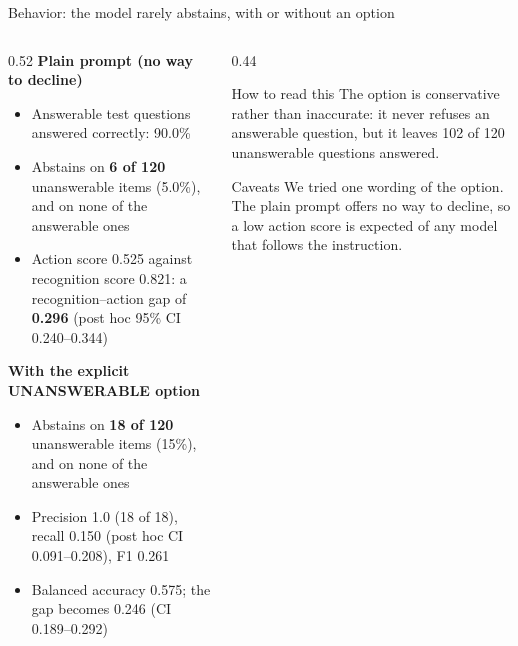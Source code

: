 \documentclass[aspectratio=169,11pt,usepdftitle=false]{beamer}
\begin{document}
\begin{frame}{Behavior: the model rarely abstains, with or without an option}
\scriptsize
\begin{columns}[T]
\begin{column}{0.52\textwidth}
\textbf{Plain prompt (no way to decline)}
\begin{itemize}
\item Answerable test questions answered correctly: 90.0\%
\item Abstains on \textbf{6 of 120} unanswerable items (5.0\%), and on none of the answerable ones
\item Action score 0.525 against recognition score 0.821: a recognition--action gap of \textbf{0.296} (post hoc 95\% CI 0.240--0.344)
\end{itemize}
\textbf{With the explicit UNANSWERABLE option}
\begin{itemize}
\item Abstains on \textbf{18 of 120} unanswerable items (15\%), and on none of the answerable ones
\item Precision 1.0 (18 of 18), recall 0.150 (post hoc CI 0.091--0.208), F1 0.261
\item Balanced accuracy 0.575; the gap becomes 0.246 (CI 0.189--0.292)
\end{itemize}
\end{column}
\begin{column}{0.44\textwidth}
\begin{block}{How to read this}
The option is conservative rather than inaccurate: it never refuses an answerable question, but it leaves 102 of 120 unanswerable questions answered.
\end{block}
\begin{alertblock}{Caveats}
We tried one wording of the option. The plain prompt offers no way to decline, so a low action score is expected of any model that follows the instruction.
\end{alertblock}
\end{column}
\end{columns}
\end{frame}
\end{document}
